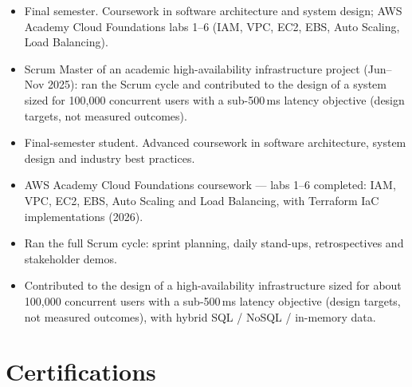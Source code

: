 \begin{itemize}
  \ifonepage
  \item Final semester. Coursework in software architecture and system design; AWS Academy Cloud
        Foundations labs 1--6 (IAM, VPC, EC2, EBS, Auto Scaling, Load Balancing).
  \item Scrum Master of an academic high-availability infrastructure project (Jun--Nov 2025): ran the
        Scrum cycle and contributed to the design of a system sized for 100{,}000 concurrent users with
        a sub-500\,ms latency objective (design targets, not measured outcomes).
  \else
  \item Final-semester student. Advanced coursework in software architecture, system design and
        industry best practices.
  \item AWS Academy Cloud Foundations coursework --- labs 1--6 completed: IAM, VPC, EC2, EBS,
        Auto Scaling and Load Balancing, with Terraform IaC implementations (2026).
  \fi
\end{itemize}
\ifonepage\else
{}
\begin{itemize}
  \item Ran the full Scrum cycle: sprint planning, daily stand-ups, retrospectives and stakeholder demos.
  \item Contributed to the design of a high-availability infrastructure sized for about 100{,}000
        concurrent users with a sub-500\,ms latency objective (design targets, not measured outcomes),
        with hybrid SQL / NoSQL / in-memory data.
\end{itemize}
\fi

\section{Certifications}

